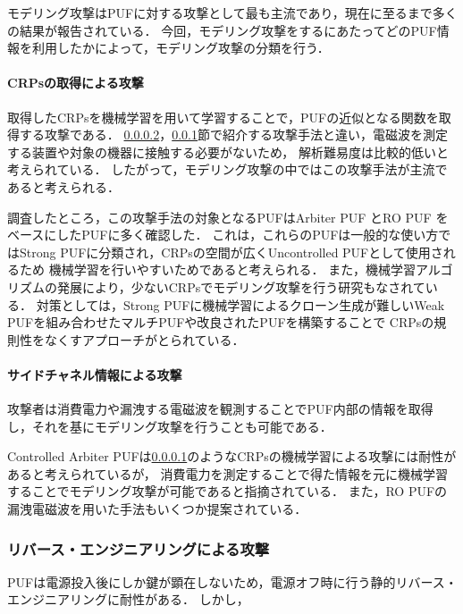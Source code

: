 \documentclass[technicalreport]{ieicej} %
\begin{document}
モデリング攻撃はPUFに対する攻撃として最も主流であり，現在に至るまで多くの結果が報告されている．
今回，モデリング攻撃をするにあたってどのPUF情報を利用したかによって，モデリング攻撃の分類を行う．
\paragraph{CRPsの取得による攻撃}
\label{Crps}
取得したCRPsを機械学習を用いて学習することで，PUFの近似となる関数を取得する攻撃である．
\ref{sidechannel}，\ref{reattack}節で紹介する攻撃手法と違い，電磁波を測定する装置や対象の機器に接触する必要がないため，
解析難易度は比較的低いと考えられている\cite{nozaki}．
したがって，モデリング攻撃の中ではこの攻撃手法が主流であると考えられる．

調査したところ，この攻撃手法の対象となるPUFはArbiter PUF\cite{crps apuf1,crps apuf2,crps apuf3 multi1,crps apuf4 side,crps apuf5 multi2,crps apuf6,crps modeling,crps apuf7 crc}
とRO PUF\cite{nozaki,crps modeling,crps RO}
をベースにしたPUFに多く確認した．
これは，これらのPUFは一般的な使い方ではStrong PUFに分類され，CRPsの空間が広くUncontrolled PUFとして使用されるため
機械学習を行いやすいためであると考えられる．
また，機械学習アルゴリズムの発展により，少ないCRPsでモデリング攻撃を行う研究もなされている\cite{nozaki}．
対策としては，Strong PUFに機械学習によるクローン生成が難しいWeak PUFを組み合わせたマルチPUF\cite{crps apuf3 multi1,crps apuf5 multi2}や改良されたPUF\cite{crps apuf7 crc}を構築することで
CRPsの規則性をなくすアプローチがとられている．

\paragraph{サイドチャネル情報による攻撃}
\label{sidechannel}
攻撃者は消費電力や漏洩する電磁波を観測することでPUF内部の情報を取得し，それを基にモデリング攻撃を行うことも可能である．

Controlled Arbiter PUFは\ref{Crps}のようなCRPsの機械学習による攻撃には耐性があると考えられているが，
消費電力を測定することで得た情報を元に機械学習することでモデリング攻撃が可能であると指摘されている\cite{side apuf}．
また，RO PUFの漏洩電磁波を用いた手法\cite{side rpuf1,side rpuf2,side rpuf3}もいくつか提案されている．
\subsubsection{リバース・エンジニアリングによる攻撃}
\label{reattack}
PUFは電源投入後にしか鍵が顕在しないため，電源オフ時に行う静的リバース・エンジニアリングに耐性がある．
しかし，
\end{document}
